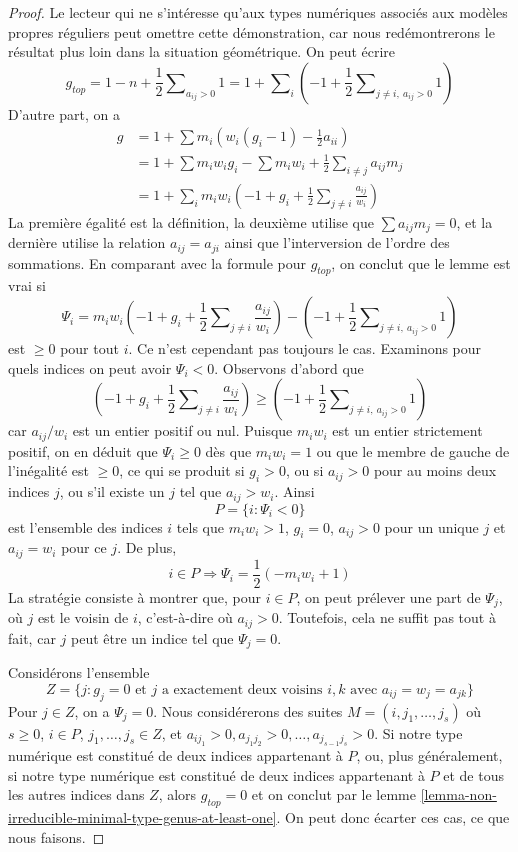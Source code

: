 \begin{proof}
Le lecteur qui ne s'intéresse qu'aux types numériques
associés aux modèles propres réguliers peut omettre cette démonstration, car nous
redémontrerons le résultat plus loin dans la situation géométrique.
On peut écrire
$$
g_{top} = 1 - n + \frac{1}{2}\sum\nolimits_{a_{ij} > 0} 1 =
1 + \sum\nolimits_i (-1 +
\frac{1}{2}\sum\nolimits_{j \not = i,\ a_{ij} > 0} 1) 
$$
D'autre part, on a
\begin{align*}
g & =
1 + \sum m_i(w_i(g_i - 1) - \frac{1}{2} a_{ii}) \\
& =
1 + \sum m_iw_ig_i - \sum m_iw_i +
\frac{1}{2} \sum\nolimits_{i \not = j} a_{ij}m_j \\
& =
1 + \sum\nolimits_i
m_iw_i(-1 + g_i + \frac{1}{2} \sum\nolimits_{j \not = i} \frac{a_{ij}}{w_i})
\end{align*}
La première égalité est la définition, la deuxième utilise que
$\sum a_{ij}m_j = 0$, et la dernière utilise
la relation $a_{ij} = a_{ji}$ ainsi que l'interversion de l'ordre
des sommations. En comparant avec la formule pour $g_{top}$, on conclut
que le lemme est vrai si
$$
\Psi_i =
m_iw_i(-1 + g_i + \frac{1}{2} \sum\nolimits_{j \not = i} \frac{a_{ij}}{w_i})
- (-1 + \frac{1}{2}\sum\nolimits_{j \not = i,\ a_{ij} > 0} 1)
$$
est $\geq 0$ pour tout $i$. Ce n'est cependant pas toujours le cas.
Examinons pour quels indices on peut avoir $\Psi_i < 0$.
Observons d'abord que
$$
(-1 + g_i + \frac{1}{2}\sum\nolimits_{j \not = i} \frac{a_{ij}}{w_i}) \geq
(-1 + \frac{1}{2}\sum\nolimits_{j \not = i,\ a_{ij} > 0} 1)
$$
car $a_{ij}/w_i$ est un entier positif ou nul. Puisque $m_iw_i$ est
un entier strictement positif, on en déduit que $\Psi_i \geq 0$ dès que
$m_iw_i = 1$ ou que le membre de gauche de l'inégalité est $\geq 0$,
ce qui se produit si $g_i > 0$, ou si $a_{ij} > 0$ pour au moins deux indices $j$, ou
s'il existe un $j$ tel que $a_{ij} > w_i$. Ainsi
$$
P = \{i : \Psi_i < 0\}
$$
est l'ensemble des indices $i$ tels que $m_iw_i > 1$, $g_i = 0$,
$a_{ij} > 0$ pour un unique $j$ et $a_{ij} = w_i$ pour ce $j$.
De plus,
$$
i \in P \Rightarrow \Psi_i = \frac{1}{2}(-m_iw_i + 1)
$$
La stratégie consiste à montrer que, pour $i \in P$, on peut prélever une part
de $\Psi_j$, où $j$ est le voisin de $i$, c'est-à-dire où $a_{ij} > 0$.
Toutefois, cela ne suffit pas tout à fait, car $j$ peut être un indice tel que $\Psi_j = 0$.

\medskip\noindent
Considérons l'ensemble
$$
Z = \{j : g_j = 0\text{ et }
j\text{ a exactement deux voisins }i, k\text{ avec }
a_{ij} = w_j = a_{jk}\}
$$
Pour $j \in Z$, on a $\Psi_j = 0$. Nous considérerons des suites
$M = (i, j_1, \ldots, j_s)$ où $s \geq 0$,
$i \in P$, $j_1, \ldots, j_s \in Z$, et
$a_{ij_1} > 0, a_{j_1j_2} > 0, \ldots, a_{j_{s - 1}j_s} > 0$.
Si notre type numérique est constitué de deux indices appartenant à $P$,
ou, plus généralement, si notre type numérique est constitué de
deux indices appartenant à $P$ et de tous les autres indices dans $Z$, alors
$g_{top} = 0$ et on conclut par le
lemme \ref{lemma-non-irreducible-minimal-type-genus-at-least-one}.
On peut donc écarter ces cas, ce que nous faisons.


\end{proof}
